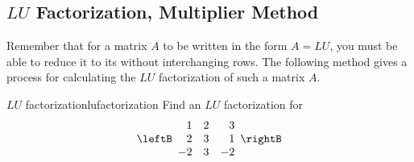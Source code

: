 \subsection{$LU$ Factorization, Multiplier Method}

Remember that for a matrix $A$ to be written in the form $A=LU$, you must be able to reduce it to its {\ef} without interchanging rows. The following method gives a process for calculating the $LU$ factorization of such a matrix $A$. 

\begin{example}{$LU$ factorization}{lufactorization}
Find an $LU$ factorization for 
\begin{equation*}
\leftB 
\begin{array}{rrr}
1 & 2 & 3 \\ 
2 & 3 & 1 \\ 
-2 & 3 & -2
\end{array}
\rightB
\end{equation*}
\end{example}

